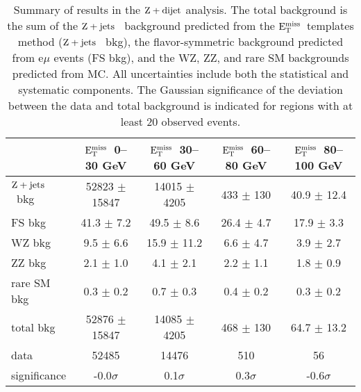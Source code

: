 \newcommand{\zjets}{$\rm{Z}+\rm{jets}$ }
\newcommand{\MET}{\ensuremath{\rm{E_{T}^{miss}}}}





\begin{table}[htb]
\begin{center}
\footnotesize
\caption{\label{tab:results_targ}\footnotesize Summary of results in the $\rm{Z}+\rm{dijet}$ analysis. The total background is the sum of the \zjets\ background predicted from
the \MET\ templates method (\zjets\ bkg), the flavor-symmetric background predicted from e$\mu$ events (FS bkg), and the WZ, ZZ, and rare SM backgrounds predicted from MC.
All uncertainties include both the statistical and systematic components. The Gaussian significance of the deviation between the data 
and total background is indicated for regions with at least 20 observed events. }
\begin{tabular}{l|c|c|c|c}

\hline
\hline

                      &   \MET\ 0--30 GeV   &  \MET\ 30--60 GeV   &  \MET\ 60--80 GeV   & \MET\ 80--100 GeV   \\
\hline
        \zjets\ bkg   & 52823 $\pm$ 15847   &  14015 $\pm$ 4205   &     433 $\pm$ 130   &   40.9 $\pm$ 12.4   \\
             FS bkg   &    41.3 $\pm$ 7.2   &    49.5 $\pm$ 8.6   &    26.4 $\pm$ 4.7   &    17.9 $\pm$ 3.3   \\
             WZ bkg   &     9.5 $\pm$ 6.6   &   15.9 $\pm$ 11.2   &     6.6 $\pm$ 4.7   &     3.9 $\pm$ 2.7   \\
             ZZ bkg   &     2.1 $\pm$ 1.0   &     4.1 $\pm$ 2.1   &     2.2 $\pm$ 1.1   &     1.8 $\pm$ 0.9   \\
        rare SM bkg   &     0.3 $\pm$ 0.2   &     0.7 $\pm$ 0.3   &     0.4 $\pm$ 0.2   &     0.3 $\pm$ 0.2   \\
\hline
          total bkg   & 52876 $\pm$ 15847   &  14085 $\pm$ 4205   &     468 $\pm$ 130   &   64.7 $\pm$ 13.2   \\
               data   &             52485   &             14476   &               510   &                56   \\
       significance   &      -0.0$\sigma$   &       0.1$\sigma$   &       0.3$\sigma$   &      -0.6$\sigma$   \\


\hline
\hline


\end{tabular}
\end{center}
\end{table}
